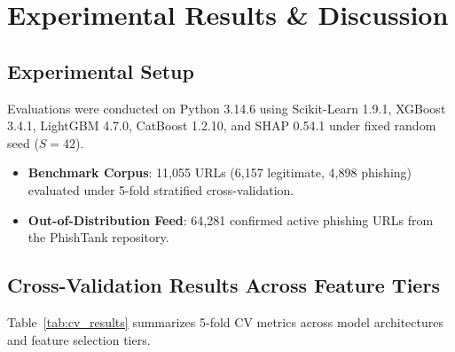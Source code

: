 \documentclass[conference]{IEEEtran}
\begin{document}
\section{Experimental Results \& Discussion}

\subsection{Experimental Setup}
Evaluations were conducted on Python 3.14.6 using Scikit-Learn 1.9.1, XGBoost 3.4.1, LightGBM 4.7.0, CatBoost 1.2.10, and SHAP 0.54.1 under fixed random seed ($S=42$).
\begin{itemize}
    \item \textbf{Benchmark Corpus}: 11,055 URLs (6,157 legitimate, 4,898 phishing) evaluated under 5-fold stratified cross-validation.
    \item \textbf{Out-of-Distribution Feed}: 64,281 confirmed active phishing URLs from the PhishTank repository.
\end{itemize}

\subsection{Cross-Validation Results Across Feature Tiers}
Table~\ref{tab:cv_results} summarizes 5-fold CV metrics across model architectures and feature selection tiers.
\end{document}
